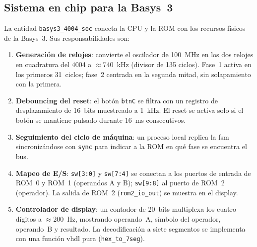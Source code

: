 \documentclass[%
    school=etsisi,%
    type=pfg,%
    degree=61CI,%
]{upm-report}
\newcommand{\vhdlfile}[1]{%
    \par\noindent{\small\sffamily\color{gray}Fichero: \texttt{#1}}\par\smallskip
}
\begin{document}
\subsection{Sistema en chip para la Basys~3}
\label{ss:soc}
\vhdlfile{basys3\_4004\_soc.vhd}

La entidad \texttt{basys3\_4004\_soc} conecta la CPU y la ROM con los recursos
físicos de la Basys~3.  Sus responsabilidades son:

\begin{enumerate}
    \item \textbf{Generación de relojes}: convierte el oscilador de 100~MHz
        en los dos relojes en cuadratura del 4004 a $\approx$740~kHz
        (divisor de 135 ciclos).  Fase~1 activa en los primeros 31~ciclos;
        fase~2 centrada en la segunda mitad, sin solapamiento con la primera.

    \item \textbf{Debouncing del reset}: el botón \texttt{btnC} se filtra con
        un registro de desplazamiento de 16~bits muestreado a 1~kHz.  El
        reset se activa solo si el botón se mantiene pulsado durante 16~ms
        consecutivos.

    \item \textbf{Seguimiento del ciclo de máquina}: un proceso local replica
        la \acrshort{fsm} sincronizándose con \texttt{sync} para indicar a
        la ROM en qué fase se encuentra el bus.

    \item \textbf{Mapeo de E/S}: \texttt{sw[3:0]} y \texttt{sw[7:4]} se
        conectan a los puertos de entrada de ROM~0 y ROM~1 (operandos A y B);
        \texttt{sw[9:8]} al puerto de ROM~2 (operador).  La salida de ROM~2
        (\texttt{rom2\_io\_out}) se muestra en el display.

    \item \textbf{Controlador de display}: un contador de 20~bits multiplexa
        los cuatro dígitos a $\approx$200~Hz, mostrando operando~A, símbolo
        del operador, operando~B y resultado.  La decodificación a siete
        segmentos se implementa con una función \acrshort{vhdl} pura
        (\texttt{hex\_to\_7seg}).
\end{enumerate}
\end{document}
